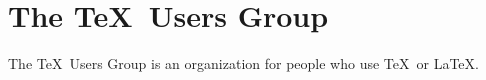 \documentclass{article}
\newcommand{\TUG}{\TeX\ Users Group\xspace}
\begin{document}
\section{The \TUG}
The \TUG      is an organization for people who use
\TeX\ or \LaTeX.
\end{document}
